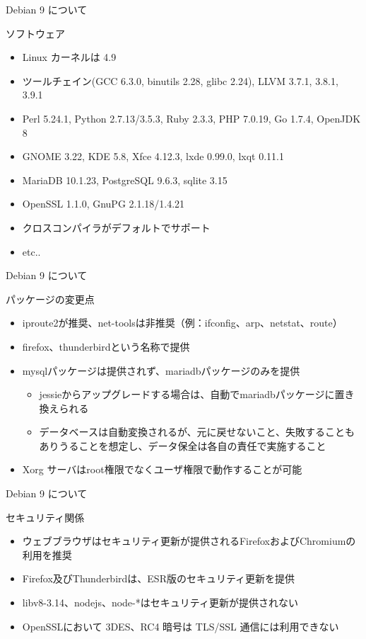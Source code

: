 \begin{frame}{Debian 9 について}%

ソフトウェア
\begin{itemize}
\item Linux カーネルは 4.9
\item ツールチェイン(GCC 6.3.0, binutils 2.28, glibc 2.24), LLVM 3.7.1, 3.8.1, 3.9.1
\item Perl 5.24.1, Python 2.7.13/3.5.3, Ruby 2.3.3, PHP 7.0.19, Go 1.7.4, OpenJDK 8
\item GNOME 3.22, KDE 5.8, Xfce 4.12.3, lxde 0.99.0, lxqt 0.11.1
\item MariaDB 10.1.23, PostgreSQL 9.6.3, sqlite 3.15
\item OpenSSL 1.1.0, GnuPG 2.1.18/1.4.21
\item クロスコンパイラがデフォルトでサポート
\item etc..
\end{itemize}

\end{frame}


\begin{frame}{Debian 9 について}%

パッケージの変更点
\begin{itemize}
\item iproute2が推奨、net-toolsは非推奨（例：ifconfig、arp、netstat、route）
\item firefox、thunderbirdという名称で提供
\item mysqlパッケージは提供されず、mariadbパッケージのみを提供
  \begin{itemize}
  \item jessieからアップグレードする場合は、自動でmariadbパッケージに置き換えられる
  \item データベースは自動変換されるが、元に戻せないこと、失敗することもありうることを想定し、データ保全は各自の責任で実施すること
  \end{itemize}
\item Xorg サーバはroot権限でなくユーザ権限で動作することが可能
\end{itemize}
\end{frame}


\begin{frame}{Debian 9 について}%

セキュリティ関係
\begin{itemize}
\item ウェブブラウザはセキュリティ更新が提供されるFirefoxおよびChromiumの利用を推奨
\item Firefox及びThunderbirdは、ESR版のセキュリティ更新を提供
\item libv8-3.14、nodejs、node-*はセキュリティ更新が提供されない
\item OpenSSLにおいて 3DES、RC4 暗号は TLS/SSL 通信には利用できない
\end{itemize}

\end{frame}


